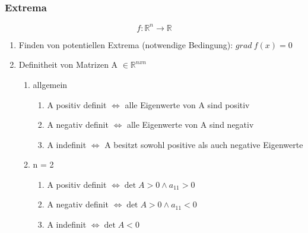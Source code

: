 \documentclass[twoside]{article}
\begin{document}
			\subsubsection{Extrema}
				
				\begin{displaymath}
					f: \mathbb{R}^n \to \mathbb{R}
				\end{displaymath}
				
				\begin{enumerate}[]
					\item Finden von potentiellen Extrema (notwendige Bedingung): \begin{math} grad \ f(x) = 0\end{math}
					\item Definitheit von Matrizen A \begin{math} \in \mathbb{R}^{nxn} \end{math}
						\begin{enumerate}[]
							\item allgemein
								\begin{enumerate}[]
									\item A positiv definit \begin{math} \Leftrightarrow \end{math} alle Eigenwerte von A sind positiv
									\item A negativ definit \begin{math} \Leftrightarrow \end{math} alle Eigenwerte von A sind negativ				
									\item A indefinit \begin{math} \Leftrightarrow \end{math} A besitzt sowohl positive als auch negative Eigenwerte
								\end{enumerate}
							\item n = 2 
								\begin{enumerate}[]
									\item A positiv definit \begin{math} \Leftrightarrow \det A > 0 \wedge a_{11} > 0 \end{math}
									\item A negativ definit \begin{math} \Leftrightarrow \det A > 0 \wedge a_{11} < 0 \end{math}
									\item A indefinit \begin{math} \Leftrightarrow \det A < 0 \end{math}

\end{enumerate}
\end{enumerate}
\end{enumerate}
\end{document}
